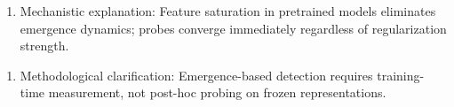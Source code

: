\begin{enumerate}
\item Mechanistic explanation: Feature saturation in pretrained models eliminates emergence dynamics; probes converge immediately regardless of regularization strength.
\end{enumerate}

\begin{enumerate}
\item Methodological clarification: Emergence-based detection requires training-time measurement, not post-hoc probing on frozen representations.
\end{enumerate}

